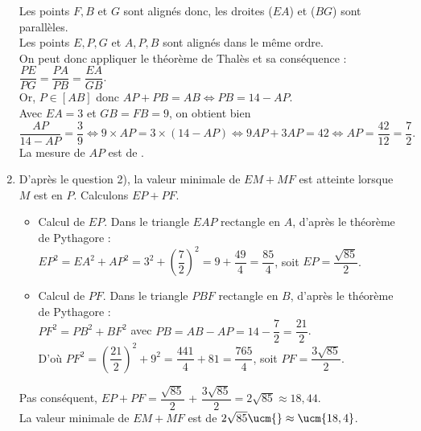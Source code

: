 \begin{corrige}
\begin{enumerate}
         Les points $F, B$ et $G$ sont alignés donc, les droites ($EA$) et ($BG$) sont parallèles. \\ 
         Les points $E, P, G$ et $A, P, B$ sont alignés dans le même ordre. \\
         On peut donc appliquer le théorème de Thalès et sa conséquence : $\dfrac{PE}{PG} =\dfrac{PA}{PB}  =\dfrac{EA}{GB}$. \\
         Or, $P\in[AB]$ donc $AP+PB =AB \iff PB =14-AP$. \\
         Avec $EA =3$ et $GB =FB =9$, on obtient bien 
         $\dfrac{AP}{14-AP} =\dfrac{3}{9} \iff 9\times AP =3\times(14-AP) \iff 9AP+3AP =42 \iff AP =\dfrac{42}{12} =\dfrac{7}{2}.$ \\ [1mm]
         {\blue La mesure de $AP$ est de }.
      \item D'après le question 2), la valeur minimale de $EM+MF$ est atteinte lorsque $M$ est en $P$. Calculons $EP+PF$.
         \begin{itemize}
            \item Calcul de $EP$. Dans le triangle $EAP$ rectangle en $A$, d'après le théorème de Pythagore : \\
               $EP^2 = EA^2 + AP^2=3^2+\left(\dfrac72\right)^2=9+\dfrac{49}{4}=\dfrac{85}{4}$, \quad soit $EP =\dfrac{\sqrt{85}}{2}$.
            \item Calcul de $PF$. Dans le triangle $PBF$ rectangle en $B$, d'après le théorème de Pythagore : \\
               $PF^2 =PB^2+BF^2$ avec $PB =AB-AP =14-\dfrac72 =\dfrac{21}{2}$. \\
               D'où  $PF^2=\left(\dfrac{21}{2}\right)^2+9^2 =\dfrac{441}{4}+81=\dfrac{765}{4}$, \quad soit $PF=\dfrac{3\sqrt{85}}{2}$. \\
         \end{itemize}
         Pas conséquent, $EP+PF =\dfrac{\sqrt{85}}{2}$ + $\dfrac{3\sqrt{85}}{2} =2\sqrt{85}\approx 18,44$. \\
         {\blue La valeur minimale de $EM+MF$ est de $2\sqrt{85} \ucm{}\approx \ucm{18,4}$}.
   \end{enumerate}
\end{corrige}

\bigskip


